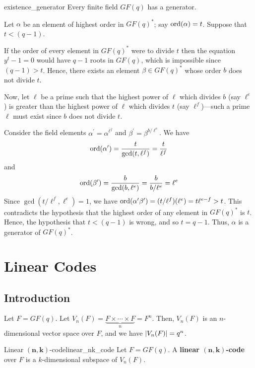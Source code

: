 \begin{Theorem}{}{existence_generator}
    Every finite field $ GF(q) $ has a generator.
\end{Theorem}

\begin{Proof}{}{}
    Let $ \alpha $ be an element of highest order in $ GF(q)^* $;
    say $ \operatorname{ord}(\alpha)=t $. Suppose that $ t<(q-1) $.

    If the order of every element in $ GF(q)^* $ were to divide $ t $ then the equation
    $ y^t-1=0 $ would have $ q-1 $ roots in $ GF(q) $, which is impossible
    since $ (q-1)>t $. Hence, there exists an element $ \beta\in GF(q)^* $
    whose order $ b $ does not divide $ t $.

    Now, let $ \ell $ be a prime such that the highest power of $ \ell $
    which divides $ b $ (say $ \ell^e $) is greater than the highest
    power of $ \ell $ which divides $ t $ (say $ \ell^f $)---such a prime
    $ \ell $ must exist since $ b $ does not divide $ t $.

    Consider the field elements $ \alpha^{\prime}=\alpha^{\ell^f} $
    and $ \beta^{\prime}=\beta^{b/\ell^e} $. We have
    \[ \operatorname{ord}(\alpha^{\prime})=\frac{t}{\gcd(t,\ell^f)} =\frac{t}{\ell^f} \]
    and
    \[ \operatorname{ord}(\beta^{\prime})=\frac{b}{\gcd(b,\ell^e)} =\frac{b}{b/\ell^e}=\ell^e \]
    Since $ \gcd(t/\ell^f,\ell^e)=1 $, we have $ \operatorname{ord}(\alpha^{\prime}\beta^{\prime})=
        (t/\ell^f)(\ell^e)=t\ell^{e-f}>t $. This contradicts the hypothesis
    that the highest order of any element in $ GF(q)^* $ is $ t $. Hence, the
    hypothesis that $ t<(q-1) $ is wrong, and so $ t=q-1 $. Thus, $ \alpha $
    is a generator of $ GF(q)^* $.
\end{Proof}

\chapter{Linear Codes}
\section{Introduction}
Let $ F=GF(q) $. Let $ V_n(F)=\underbrace{F\times\cdots\times F}_{n}=F^n $.
Then, $ V_n(F) $ is an $ n $-dimensional vector space over $ F $, and
we have $ \lvert V_n(F)\rvert=q^n $.

\begin{Definition}{Linear $ \symbf{(n,k)} $-code}{linear_nk_code}
    Let $ F=GF(q) $.
    A \textbf{linear $ \symbf{(n,k)} $-code} over $ F $ is a $ k $-dimensional subspace
    of $ V_n(F) $.
\end{Definition}

